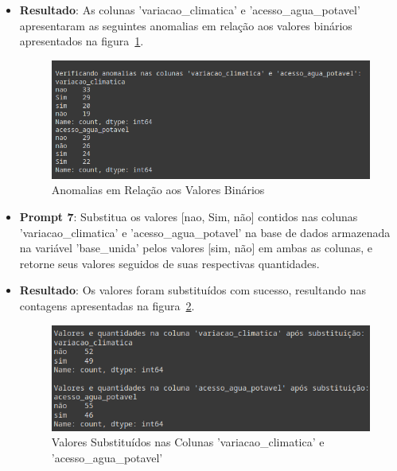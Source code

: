 \documentclass[12pt, a4paper, onecolumn]{article}
\begin{document}
\begin{itemize}
        \item \textbf{Resultado}: As colunas 'variacao\_climatica' e 'acesso\_agua\_potavel' apresentaram as seguintes anomalias em relação aos valores binários apresentados na figura~\ref{fig:anomalias_binarias}.
        
        \begin{figure}[htbp]
            \centering
            \includegraphics[width=1\textwidth]{figures/anomalias-binarias.png}
            \caption{Anomalias em Relação aos Valores Binários}
            \label{fig:anomalias_binarias}
        \end{figure}
        
        \item \textbf{Prompt 7}: Substitua os valores [nao, Sim, não] contidos nas colunas  'variacao\_climatica' e 'acesso\_agua\_potavel' na base de dados armazenada na variável 'base\_unida' pelos valores [sim, não] em ambas as colunas, e retorne seus valores seguidos de suas respectivas quantidades.
        
        \item \textbf{Resultado}: Os valores foram substituídos com sucesso, resultando nas contagens apresentadas na figura~\ref{fig:resultado_subs_anomalias_binarias}. 
        \begin{figure}[htbp]
            \centering
            \includegraphics[width=1\textwidth]{figures/resultado-subs-anomalias-binarias.png}
            \caption{Valores Substituídos nas Colunas 'variacao\_climatica' e 'acesso\_agua\_potavel'}
            \label{fig:resultado_subs_anomalias_binarias}
        \end{figure}


\end{itemize}
\end{document}
